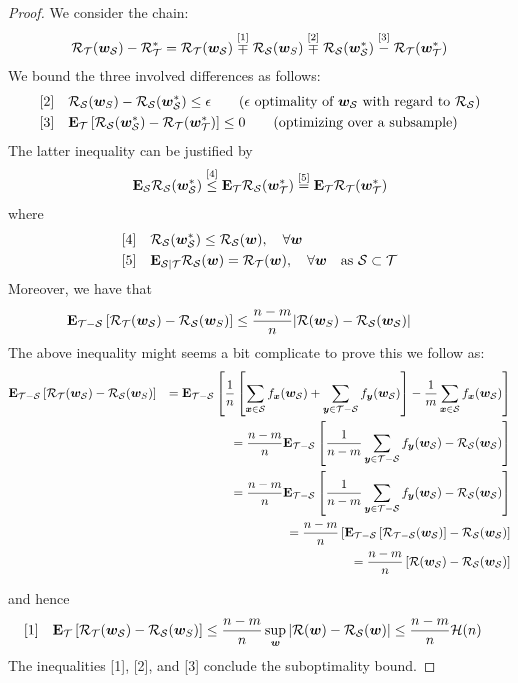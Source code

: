 \begin{proof}
 We consider the chain:
\begin{align}
{\cal R}_{\cal T}(\bm{w}_{\cal S}) - {\cal R}_{\cal T}^* = {\cal R}_{\cal T}(\bm{w}_{\cal S}) \stackrel{[1]}{\mp} {\cal R}_{\cal S}(\bm{w}_S) \stackrel{[2]}{\mp} {\cal R}_{\cal S}(\bm{w}_{\cal S}^*) \stackrel{[3]}{-} {\cal R}_{\cal T}(\bm{w}_{\cal T}^*)
\end{align}
We bound the three involved differences as follows: 
\begin{align}
\text{[2]} \quad & {\cal R}_{\cal S}(\bm{w}_S)  - {\cal R}_{\cal S}(\bm{w}_{\cal S}^*) \le \epsilon  \qquad 
\text{($\epsilon$ optimality of $\bm{w}_{\cal S}$ with regard to ${\cal R}_{\cal S}$)}
\\
\text{[3]} \quad & \mathbf{E}_{\cal T} \left[ {\cal R}_{\cal S}(\bm{w}_{\cal S}^*) - {\cal R}_{\cal T}(\bm{w}_{\cal T}^*) \right] \le 0 \qquad 
\text{(optimizing over a subsample)}
\end{align}
The latter inequality can be justified by
\begin{align}
\mathbf{E}_{{\cal S}} {\cal R}_{\cal S}(\bm{w}_{\cal S}^*) \stackrel{[4]}{\le} \mathbf{E}_{{\cal T}} {\cal R}_{\cal S}(\bm{w}_{\cal T}^*)  \stackrel{[5]}= \mathbf{E}_{{\cal T}} {\cal R}_{\cal T}(\bm{w}_{\cal T}^*)  
\end{align}
where 
\begin{align}
\text{[4]} \quad & {\cal R}_{\cal S}(\bm{w}_{\cal S}^*) \le {\cal R}_{\cal S}(\bm{w}), \quad \forall \bm{w}\\
\text{[5]} \quad & \mathbf{E}_{{\cal S} | {\cal T}} {\cal R}_{\cal S}(\bm{w}) = {\cal R}_{\cal T}(\bm{w}), \quad \forall \bm{w} \quad \text{as ${\cal S} \subset {\cal T}$}
\end{align}
Moreover, we have that
\begin{align}
& \mathbf{E}_{{\cal T}-{\cal S}} \left[ {\cal R}_{\cal T}(\bm{w}_{\cal S}) - {\cal R}_{\cal S}(\bm{w}_S) \right] \le \frac{n- m}{n}
| {\cal R}(\bm{w}_S) - {\cal R}_{\cal S}(\bm{w}_{\cal S}) | \label{eq:t-s} \qquad 
\end{align}
The above inequality might seems a bit complicate to prove this we follow as: 
\begin{eqnarray*}
  & \mathbf{E}_{{\cal T}-{\cal S}} \left[ {\cal R}_{\cal T}(\bm{w}_{\cal S}) - {\cal R}_{\cal S}(\bm{w}_S) \right] & = \mathbf{E}_{{\cal T}-{\cal S}}
  \left[
  \frac{1}{n} \left[  \sum_{\bm{x} \in {\cal S}} f_{\bm{x}}(\bm{w}_{\cal S})  + \sum_{\bm{y} \in {\cal T} - {\cal S}}
  f_{\bm{y}}(\bm{w}_{\cal S})\right] - \frac{1}{m}  \sum_{\bm{x} \in {\cal S}} f_{\bm{x}}(\bm{w}_{\cal S})  \right]\\
  & & =  
  \frac{n-m}{n} \mathbf{E}_{{\cal T}-{\cal S}} \left[ \frac{1}{n-m} \sum_{\bm{y} \in {\cal T} - {\cal S}}
  f_{\bm{y}}(\bm{w}_{\cal S}) -  {\cal R}_{\cal S}(\bm{w}_{{\cal S}}) \right] \\
  & & = \frac{n-m}{n} \mathbf{E}_{{\cal T}-{\cal S}} \left[ \frac{1}{n-m} \sum_{\bm{y} \in {\cal T} - {\cal S}}
  f_{\bm{y}}(\bm{w}_{\cal S}) -  {\cal R}_{\cal S}(\bm{w}_{{\cal S}}) \right]\\ 
  & &  = \frac{n-m}{n}\left[ \mathbf{E}_{{\cal T}-{\cal S}} \left[ {\cal R}_{{\cal T}-{\cal S}}(\bm{w}_{\cal S}) \right]-
  {\cal R}_{\cal S}(\bm{w}_{{\cal S}}) \right] \\ 
  & & = \frac{n-m}{n} \left[{\cal R}(\bm{w}_{{\cal S}}) - {\cal R}_{\cal S}(\bm{w}_{{\cal S}})\right]
\end{eqnarray*}

and hence 
\begin{align}
\text{[1]} \quad & \mathbf{E}_{{\cal T}} \left[ {\cal R}_{\cal T}(\bm{w}_{\cal S}) - {\cal R}_{\cal S}(\bm{w}_S) \right] \le
\frac{n-m}{n} \sup_{\bm{w}} | {\cal R}(\bm{w}) - {\cal R}_{\cal S}(\bm{w}) | \le \frac{n-m}{n} {\cal H}(n)
\end{align}
The inequalities [1], [2], and [3] conclude the suboptimality bound. 
\end{proof}
